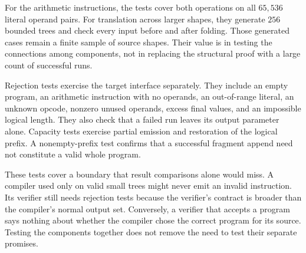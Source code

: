 For the arithmetic instructions, the tests cover both operations on all $65{,}536$ literal operand pairs.
For translation across larger shapes, they generate $256$ bounded trees and check every input before and after folding.
Those generated cases remain a finite sample of source shapes.
Their value is in testing the connections among components, not in replacing the structural proof with a large count of successful runs.

Rejection tests exercise the target interface separately.
They include an empty program, an arithmetic instruction with no operands, an out-of-range literal, an unknown opcode, nonzero unused operands, excess final values, and an impossible logical length.
They also check that a failed run leaves its output parameter alone.
Capacity tests exercise partial emission and restoration of the logical prefix.
A nonempty-prefix test confirms that a successful fragment append need not constitute a valid whole program.

These tests cover a boundary that result comparisons alone would miss.
A compiler used only on valid small trees might never emit an invalid instruction.
Its verifier still needs rejection tests because the verifier's contract is broader than the compiler's normal output set.
Conversely, a verifier that accepts a program says nothing about whether the compiler chose the correct program for its source.
Testing the components together does not remove the need to test their separate promises.
